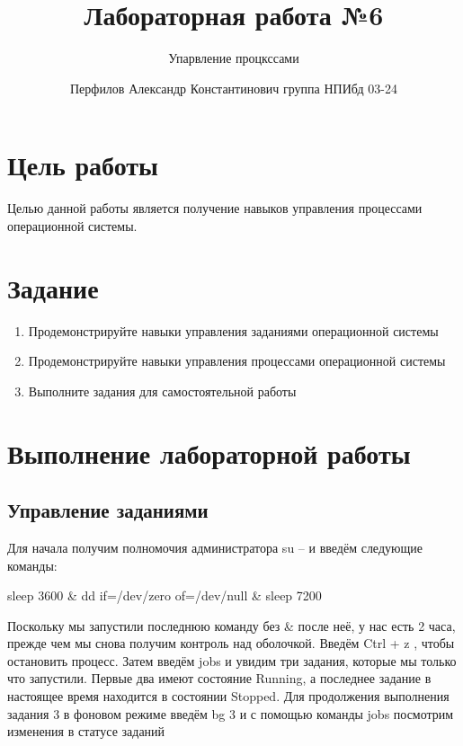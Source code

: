\documentclass[
  english,
  russian,
  12pt,
  a4paper,
  DIV=11,
  numbers=noendperiod]{scrreprt}
\title{Лабораторная работа №6}
\subtitle{Упарвление процкссами}
\author{Перфилов Александр Константинович \textbar{} группа НПИбд 03-24}
\date{}
\providecommand{\tightlist}{%
  \setlength{\itemsep}{0pt}\setlength{\parskip}{0pt}}
\renewcommand*\contentsname{Содержание}
\newcommand\contentsname{Содержание}
\begin{document}
\maketitle

\renewcommand*\contentsname{Содержание}
{
\setcounter{tocdepth}{1}
\tableofcontents
}
\listoffigures
\listoftables

\chapter{Цель
работы}\label{ux446ux435ux43bux44c-ux440ux430ux431ux43eux442ux44b}

Целью данной работы является получение навыков управления процессами
операционной системы.

\chapter{Задание}\label{ux437ux430ux434ux430ux43dux438ux435}

\begin{enumerate}
\def\labelenumi{\arabic{enumi}.}
\tightlist
\item
  Продемонстрируйте навыки управления заданиями операционной системы
\item
  Продемонстрируйте навыки управления процессами операционной системы
\item
  Выполните задания для самостоятельной работы
\end{enumerate}

\chapter{Выполнение лабораторной
работы}\label{ux432ux44bux43fux43eux43bux43dux435ux43dux438ux435-ux43bux430ux431ux43eux440ux430ux442ux43eux440ux43dux43eux439-ux440ux430ux431ux43eux442ux44b}

\section{Управление
заданиями}\label{ux443ux43fux440ux430ux432ux43bux435ux43dux438ux435-ux437ux430ux434ux430ux43dux438ux44fux43cux438}

Для начала получим полномочия администратора su -- и введём следующие
команды:

sleep 3600 \& dd if=/dev/zero of=/dev/null \& sleep 7200

Поскольку мы запустили последнюю команду без \& после неё, у нас есть 2
часа, прежде чем мы снова получим контроль над оболочкой. Введём Ctrl +
z , чтобы остановить процесс. Затем введём jobs и увидим три задания,
которые мы только что запустили. Первые два имеют состояние Running, а
последнее задание в настоящее время находится в состоянии Stopped. Для
продолжения выполнения задания 3 в фоновом режиме введём bg 3 и с
помощью команды jobs посмотрим изменения в статусе заданий
\end{document}
